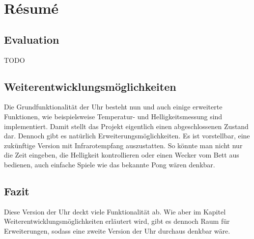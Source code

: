 \section{Résumé}
\subsection{Evaluation}
TODO

\subsection{Weiterentwicklungsmöglichkeiten}
Die Grundfunktionalität der Uhr besteht nun und auch einige erweiterte Funktionen, wie beispielsweise Temperatur- und Helligkeitsmessung sind implementiert. Damit stellt das Projekt eigentlich einen abgeschlossenen Zustand dar. Dennoch gibt es natürlich Erweiterungsmöglichkeiten. Es ist vorstellbar, eine zukünftige Version mit Infrarotempfang auszustatten. So könnte man nicht nur die Zeit eingeben, die Helligkeit kontrollieren oder einen Wecker vom Bett aus bedienen, auch einfache Spiele wie das bekannte Pong wären denkbar. %

%
\subsection{Fazit}
Diese Version der Uhr deckt viele Funktionalität ab. Wie aber im Kapitel Weiterentwicklungsmöglichkeiten erläutert wird, gibt es dennoch Raum für Erweiterungen, sodass eine zweite Version der Uhr durchaus denkbar wäre.
